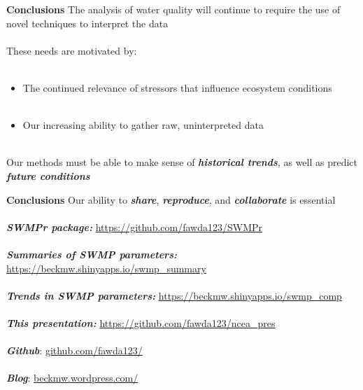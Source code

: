 \documentclass[serif]{beamer}\usepackage[]{graphicx}\usepackage[]{color}
\newcommand{\emtxt}[1]{\textbf{\textit{#1}}}
\begin{document}
\begin{frame}{\textbf{Conclusions}}
The analysis of water quality will continue to require the use of novel techniques to interpret the data \\~\\
These needs are motivated by: \\~\\
\begin{itemize}
\item The continued relevance of stressors that influence ecosystem conditions \\~\\
\item Our increasing ability to gather raw, uninterpreted data \\~\\
\end{itemize}
Our methods must be able to make sense of \emtxt{historical trends}, as well as predict \emtxt{future conditions}
\end{frame}

\begin{frame}{\textbf{Conclusions}}
Our ability to \emtxt{share}, \emtxt{reproduce}, and \emtxt{collaborate} is essential \\~\\
\emtxt{SWMPr package:} \href{https://github.com/fawda123/SWMPr}{https://github.com/fawda123/SWMPr} \\~\\
\emtxt{Summaries of SWMP parameters:} \href{https://beckmw.shinyapps.io/swmp_summary}{https://beckmw.shinyapps.io/swmp\_summary} \\~\\
\emtxt{Trends in SWMP parameters:} \href{https://beckmw.shinyapps.io/swmp_comp}{https://beckmw.shinyapps.io/swmp\_comp} \\~\\
\emtxt{This presentation:} \href{https://github.com/fawda123/ncea_pres}{https://github.com/fawda123/ncea\_pres} \\~\\
\emtxt{Github}: \href{https://github.com/fawda123/}{github.com/fawda123/} \\~\\
\emtxt{Blog}: \href{http://beckmw.wordpress.com/}{beckmw.wordpress.com/}
\end{frame}
\end{document}
